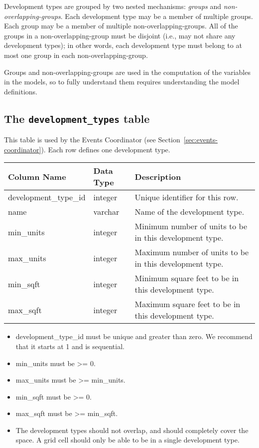 Development types are grouped by two nested mechanisms: \emph{groups} and
\emph{non-overlapping-groups}. Each development type may be a member of
multiple groups. Each group may be a member of multiple
non-overlapping-groups. All of the groups in a non-overlapping-group must be
disjoint (i.e., may not share any development types); in other words, each
development type must belong to at most one group in each
non-overlapping-group.

Groups and non-overlapping-groups are used in the computation of the variables \variablesindex
in the models, so to fully understand them requires understanding the model \modelsindex
definitions.

\subsection{The {\tt development_types} table}

This table is used by the Events Coordinator (see Section~\ref{sec:events-coordinator}).
Each row defines one development type.

\begin{tabular}{lll}

\textbf{Column Name} & \textbf{Data Type} & \textbf{Description} \\

\hline development_type_id & integer & Unique identifier for this row.  \\

\hline name & varchar & Name of the development type.  \\

\hline min_units & integer & Minimum number of units to be in this development
type.  \\

\hline max_units & integer & Maximum number of units to be in this development
type.  \\

\hline min_sqft & integer & Minimum square feet to be in this development type.
\\

\hline max_sqft & integer & Maximum square feet to be in this development type.
\\

\hline

\end{tabular}

\begin{itemize}
\tight
\item development_type_id must be unique and greater than zero. We recommend that it starts at 1 and is sequential.
\item min_units must be \textgreater{}= 0.
\item max_units must be \textgreater{}= min_units.
\item min_sqft must be \textgreater{}= 0.
\item max_sqft must be \textgreater{}= min_sqft.
\item The development types should not overlap, and should completely cover the
space.  A grid cell should only be able to be in a single development type.
\end{itemize}


